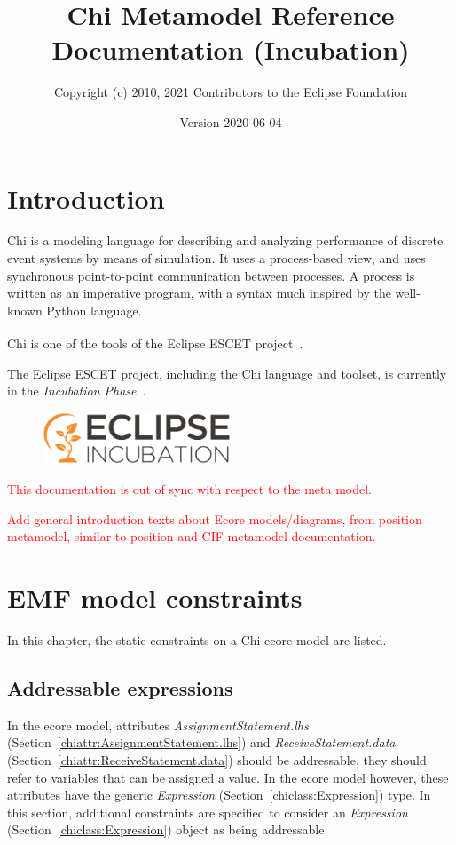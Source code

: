\documentclass{report}
\title{Chi Metamodel Reference Documentation (Incubation)}
\author{Copyright (c) 2010, 2021 Contributors to the Eclipse Foundation}
\date{Version 2020-06-04}
\newcommand{\chiclass}[1]{\textit{#1} (Section~\ref{chiclass:#1})}
\newcommand{\chiattr}[1]{\textit{#1} (Section~\ref{chiattr:#1})}
\newcommand{\todo}[1]{\textcolor{red}{#1}}
\begin{document}
\maketitle
\tableofcontents

\chapter{Introduction}

Chi is a modeling language for describing and analyzing performance of
discrete event systems by means of simulation.
It uses a process-based view, and uses synchronous point-to-point
communication between processes. A process is written as an imperative
program, with a syntax much inspired by the well-known Python language.

Chi is one of the tools of the Eclipse ESCET\textsuperscript{\texttrademark{}}
project~\cite{Eclipse:ESCET}.

The Eclipse ESCET project, including the Chi language and toolset, is
currently in the \emph{Incubation Phase}~\cite{Eclipse:Incubation}.
\begin{figure}[H]
  \centering
  \includegraphics[width=0.5\textwidth]{figures/eclipse-incubation.png}
\end{figure}

\todo{This documentation is out of sync with respect to the meta model.}

\todo{Add general introduction texts about Ecore models/diagrams, from
position metamodel, similar to position and CIF metamodel documentation.}


\chapter{EMF model constraints}
In this chapter, the static constraints on a Chi ecore model are listed.

\section{Addressable expressions}\label{sect:addressable-expressions}
In the ecore model, attributes \chiattr{AssignmentStatement.lhs} and
\chiattr{ReceiveStatement.data} should be addressable, they should refer to
variables that can be assigned a value.
In the ecore model however, these attributes have the generic
\chiclass{Expression} type. In this section, additional constraints are
specified to consider an \chiclass{Expression} object as being addressable.
\end{document}
